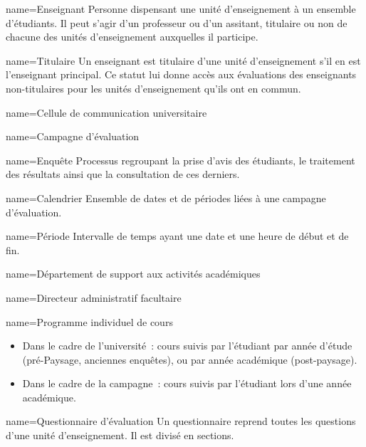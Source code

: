 	{name=Enseignant}
	{Personne dispensant une unité d'enseignement à un ensemble d'étudiants.
	Il peut s'agir d'un professeur ou d'un assitant, titulaire ou non de chacune des unités d'enseignement auxquelles il participe.}

	{name=Titulaire}
	{Un enseignant est titulaire d'une unité d'enseignement s'il en est l'enseignant principal.
	Ce statut lui donne accès aux évaluations des enseignants non-titulaires pour les unités d'enseignement qu'ils ont en commun.}

	{name=Cellule de communication universitaire}
	{}

	{name=Campagne d'évaluation}
	{}


	{name=Enquête}
	{Processus regroupant la prise d'avis des étudiants, le traitement des résultats ainsi que la consultation de ces derniers.}

	{name=Calendrier}
	{Ensemble de dates et de périodes liées à une campagne d'évaluation.}

	{name=Période}
	{Intervalle de temps ayant une date et une heure de début et de fin.}

	{name=Département de support aux activités académiques}


	{name=Directeur administratif facultaire}
	{}


	{name=Programme individuel de cours}
	{
	\begin{itemize}
		\item Dans le cadre de l'université~: cours suivis par l'étudiant par année d'étude (pré-Paysage, anciennes enquêtes), ou par année académique (post-paysage).
		\item Dans le cadre de la campagne~: cours suivis par l'étudiant lors d'une année académique.
	\end{itemize}
	}


	{name=Questionnaire d'évaluation}
	{Un questionnaire reprend toutes les questions d'une unité d'enseignement.
	Il est divisé en sections.}

